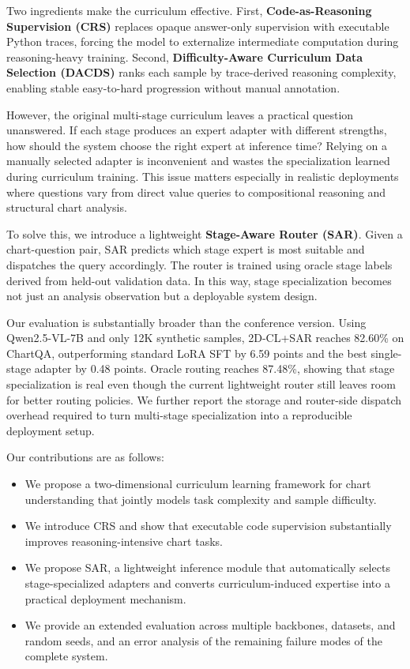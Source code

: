 \documentclass[journal]{IEEEtran}
\newcommand{\method}{2D-CL}
\newcommand{\crs}{CRS}
\newcommand{\dacds}{DACDS}
\newcommand{\sar}{SAR}
\begin{document}
Two ingredients make the curriculum effective.
First, \textbf{Code-as-Reasoning Supervision (\crs{})} replaces opaque answer-only supervision with executable Python traces, forcing the model to externalize intermediate computation during reasoning-heavy training.
Second, \textbf{Difficulty-Aware Curriculum Data Selection (\dacds{})} ranks each sample by trace-derived reasoning complexity, enabling stable easy-to-hard progression without manual annotation.

However, the original multi-stage curriculum leaves a practical question unanswered.
If each stage produces an expert adapter with different strengths, how should the system choose the right expert at inference time?
Relying on a manually selected adapter is inconvenient and wastes the specialization learned during curriculum training.
This issue matters especially in realistic deployments where questions vary from direct value queries to compositional reasoning and structural chart analysis.

To solve this, we introduce a lightweight \textbf{Stage-Aware Router (\sar{})}.
Given a chart-question pair, \sar{} predicts which stage expert is most suitable and dispatches the query accordingly.
The router is trained using oracle stage labels derived from held-out validation data.
In this way, stage specialization becomes not just an analysis observation but a deployable system design.

Our evaluation is substantially broader than the conference version.
Using Qwen2.5-VL-7B and only 12K synthetic samples, \method{}+\sar{} reaches 82.60\% on ChartQA, outperforming standard LoRA SFT by 6.59 points and the best single-stage adapter by 0.48 points.
Oracle routing reaches 87.48\%, showing that stage specialization is real even though the current lightweight router still leaves room for better routing policies.
We further report the storage and router-side dispatch overhead required to turn multi-stage specialization into a reproducible deployment setup.

Our contributions are as follows:
\begin{itemize}
    \item We propose a two-dimensional curriculum learning framework for chart understanding that jointly models task complexity and sample difficulty.
    \item We introduce \crs{} and show that executable code supervision substantially improves reasoning-intensive chart tasks.
    \item We propose \sar{}, a lightweight inference module that automatically selects stage-specialized adapters and converts curriculum-induced expertise into a practical deployment mechanism.
    \item We provide an extended evaluation across multiple backbones, datasets, and random seeds, and an error analysis of the remaining failure modes of the complete system.
\end{itemize}
\end{document}
